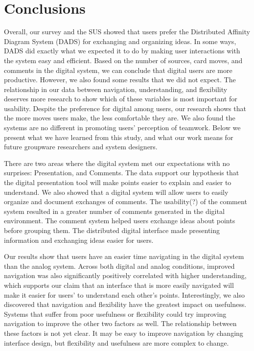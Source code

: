 \section{Conclusions}

Overall, our survey and the SUS showed that users prefer the Distributed Affinity Diagram System (DADS) for exchanging and organizing ideas. In some ways, DADS did exactly what we expected it to do by making user interactions with the system easy and efficient. Based on the number of sources, card moves, and comments in the digital system, we can conclude that digital users are more productive. However, we also found some results that we did not expect. The relationship in our data between navigation, understanding, and flexibility deserves more research to show which of these variables is most important for usability. Despite the preference for digital among users, our research shows that the more moves users make, the less comfortable they are. We also found the systems are no different in promoting users' perception of teamwork. Below we present what we have learned from this study, and what our work means for future groupware researchers and system designers.

There are two areas where the digital system met our expectations with no surprises: Presentation, and Comments.  The data support our hypothesis that the digital presentation tool will make points easier to explain and easier to understand. We also showed that a digital system will allow users to easily organize and document exchanges of comments. The usability(?) of the comment system resulted in a greater number of comments generated in the digital environment. The comment system helped users exchange ideas about points before grouping them. The distributed digital interface made presenting information and exchanging ideas easier for users.

Our results show that users have an easier time navigating in the digital system than the analog system. Across both digital and analog conditions, improved navigation was also significantly positively correlated with higher understanding, which supports our claim that an interface that is more easily navigated will make it easier for users' to understand each other's points. Interestingly, we also discovered that navigation and flexibility have the greatest impact on usefulness. Systems that suffer from poor usefulness or flexibility could try improving navigation to improve the other two factors as well. The relationship between these factors is not yet clear. It may be easy to improve navigation by changing interface design, but flexibility and usefulness are more complex to change. 

